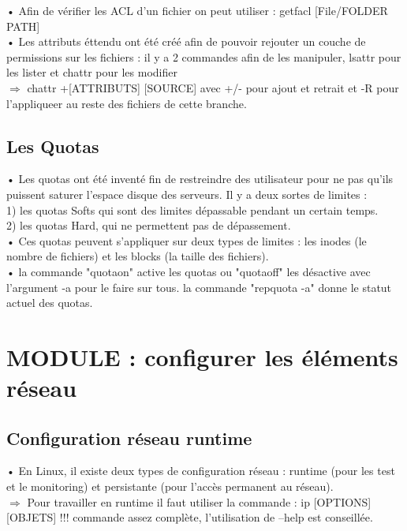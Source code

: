 \documentclass[a4paper, 11pt, french, oneside]{book}
\begin{document}
 • Afin de vérifier les ACL d'un fichier on peut utiliser : getfacl [File/FOLDER PATH]\\

• Les attributs éttendu ont été créé afin de pouvoir rejouter un couche de permissions sur les fichiers : il y a 2 commandes afin de les manipuler, lsattr pour les lister et chattr pour les modifier\\

 $\Rightarrow$ chattr +[ATTRIBUTS] [SOURCE] avec +/- pour ajout et retrait et -R pour l'appliqueer au reste des fichiers de cette branche.\\

\section{\Large Les Quotas}

• Les quotas ont été inventé fin de restreindre des utilisateur pour ne pas qu'ils puissent saturer l'espace disque des serveurs. Il y a deux sortes de limites :   \\

 1) les quotas Softs qui sont des limites dépassable pendant un certain temps. \\
 2) les quotas Hard, qui ne permettent pas de dépassement. \\

• Ces quotas peuvent s'appliquer sur deux types de limites : les inodes (le nombre de fichiers) et les blocks (la taille des fichiers).\\

• la commande "quotaon" active les quotas ou "quotaoff" les désactive avec l'argument -a pour le faire sur tous. la commande "repquota -a" donne le statut actuel des quotas.\\

\chapter{MODULE : configurer les éléments réseau}
\section{\Large Configuration réseau runtime}

• En Linux, il existe deux types de configuration réseau : runtime (pour les test et le monitoring) et persistante (pour l'accès permanent au réseau).\\


 $\Rightarrow$ Pour travailler en runtime il faut utiliser la commande : ip [OPTIONS][OBJETS] !!! commande assez complète, l'utilisation de --help est conseillée. \\
\end{document}
